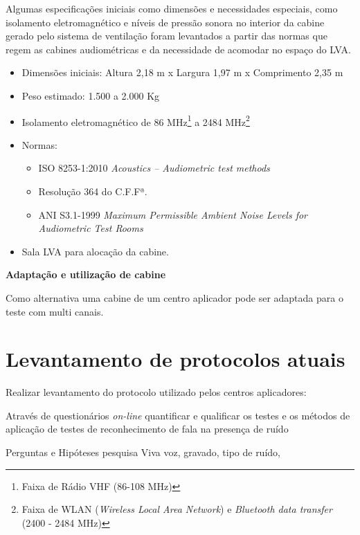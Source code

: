 Algumas especificações iniciais como dimensões e necessidades especiais, como isolamento eletromagnético e níveis de pressão sonora no interior da cabine gerado pelo sistema de ventilação foram levantados a partir das normas que regem as cabines audiométricas e da necessidade de acomodar no espaço do LVA.

\begin{itemize}[noitemsep]
    \item Dimensões iniciais: Altura 2,18 m x Largura 1,97 m x Comprimento 2,35 m
    
    \item Peso estimado: 1.500 a 2.000 Kg 
    \item Isolamento eletromagnético de 86 MHz\footnote{Faixa de Rádio VHF (86-108 MHz)} a  2484 MHz\footnote{Faixa de WLAN (\textit{Wireless Local Area Network}) e \textit{Bluetooth data transfer} (2400 - 2484 MHz)}
    \item Normas: 
    \begin{itemize}
        \item ISO 8253-1:2010 \textit{Acoustics -- Audiometric test methods} 
        \item  Resolução 364 do C.F.Fª.
        \item ANI S3.1-1999 \textit{Maximum Permissible Ambient Noise Levels for Audiometric Test Rooms}
    \end{itemize}
    
    \item Sala LVA para alocação da cabine.
    
\end{itemize} 

\textbf{Adaptação e utilização de cabine}

Como alternativa uma cabine de um centro aplicador pode ser adaptada para o teste com multi canais.
\section{Levantamento de protocolos atuais}
Realizar levantamento do protocolo utilizado pelos centros aplicadores:

Através de questionários \textit{on-line} quantificar e qualificar os testes e os métodos de aplicação de testes de reconhecimento de fala na presença de ruído

Perguntas e Hipóteses pesquisa
Viva voz, gravado, tipo de ruído, 

